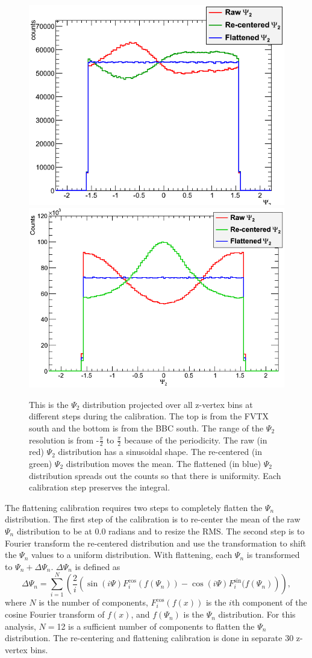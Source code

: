 \begin{figure}[!h]
\begin{center}
\includegraphics[width=0.65\linewidth]{figs/flattened_example_fvtx.png}
\includegraphics[width=0.62\linewidth]{figs/flattened_example_bbc.png}
\caption{This is the $\Psi_2$ distribution projected over all z-vertex bins at different steps during the calibration. The top is from the FVTX south and the bottom is from the BBC south. The range of the $\Psi_2$ resolution is from -$\frac{\pi}{2}$ to $\frac{\pi}{2}$ because of the periodicity. The raw (in red) $\Psi_2$ distribution has a sinusoidal shape. The re-centered (in green) $\Psi_2$ distribution moves the mean. The flattened (in blue) $\Psi_2$ distribution spreads out the counts so that there is uniformity. Each calibration step preserves the integral.}
\end{center}
\label{fig:calibrated_psi}
\end{figure}

The flattening calibration requires two steps to completely flatten the $\Psi_n$ distribution. The first step of the calibration is to re-center the mean of the raw $\Psi_n$ distribution to be at 
0.0 radians and to resize the RMS. The second step is to Fourier transform the re-centered distribution and use the transformation to shift the $\Psi_n$ values to a uniform distribution. With flattening, each $\Psi_n$ is transformed to $\Psi_n + \Delta\Psi_n$. $\Delta\Psi_n$ is defined as
\begin{equation}
\Delta\Psi_n = \sum^{N}_{i=1}\left(\frac{2}{i}\left(\sin(i \Psi)F^{\cos}_{i}(f(\Psi_n))-\cos(i \Psi)F^{\sin}_{i}(f(\Psi_n)\right)\right),
\label{eq:deltapsi}
\end{equation}
where $N$ is the number of components, $F^{\cos}_{i}(f(x))$ is the $i$th component of the cosine Fourier transform of $f(x)$, and $f(\Psi_n)$ is the $\Psi_n$ distribution. For this analysis, $N=$12 is a sufficient number of components to flatten the $\Psi_n$ distribution. The re-centering and flattening calibration is done in separate 30 z-vertex bins.

